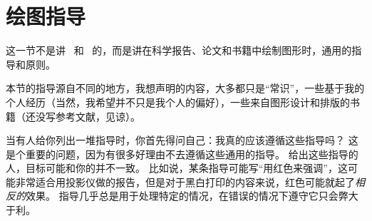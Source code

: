 %
%
%


\section{绘图指导}

\bohs

这一节不是讲 \pgfname\ 和 \tikzname\ 的，而是讲在科学报告、论文和书籍中绘制图形时，通用的指导和原则。

本节的指导源自不同的地方，我想声明的内容，大多都只是“常识”，一些基于我的个人经历（当然，我希望并不只是我个人的偏好），一些来自图形设计和排版的书籍（还没写参考文献，见谅）。

当有人给你列出一堆指导时，你首先得问自己：我真的应该遵循这些指导吗？
这是个重要的问题，因为有很多好理由不去遵循这些通用的指导。
给出这些指导的人，目标可能和你的并不一致。
比如说，某条指导可能写“用红色来强调”，这可能非常适合用投影仪做的报告，但是对于黑白打印的内容来说，红色可能就起了\emph{相反的}效果。
指导几乎总是用于处理特定的情况，在错误的情况下遵守它只会弊大于利。

